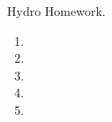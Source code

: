 \documentclass[12pt,preprint]{aastex}  %
\begin{document}
Hydro Homework.

\begin{enumerate}
\item 
\item 
\item 
\item 
\item 
\end{enumerate}
\end{document}
